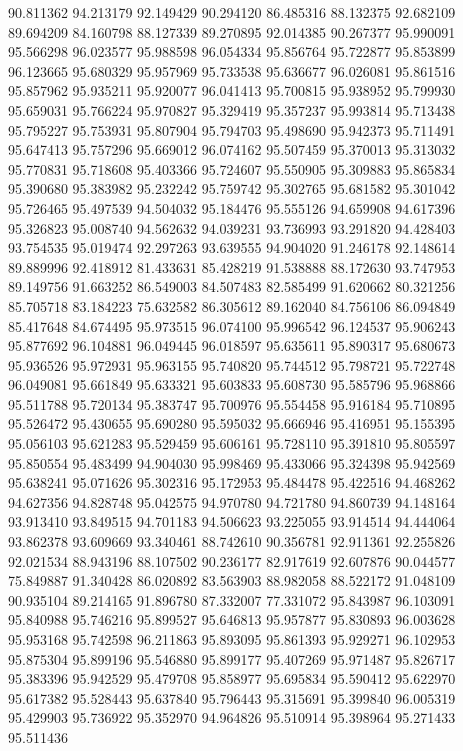 90.811362
94.213179
92.149429
90.294120
86.485316
88.132375
92.682109
89.694209
84.160798
88.127339
89.270895
92.014385
90.267377
95.990091
95.566298
96.023577
95.988598
96.054334
95.856764
95.722877
95.853899
96.123665
95.680329
95.957969
95.733538
95.636677
96.026081
95.861516
95.857962
95.935211
95.920077
96.041413
95.700815
95.938952
95.799930
95.659031
95.766224
95.970827
95.329419
95.357237
95.993814
95.713438
95.795227
95.753931
95.807904
95.794703
95.498690
95.942373
95.711491
95.647413
95.757296
95.669012
96.074162
95.507459
95.370013
95.313032
95.770831
95.718608
95.403366
95.724607
95.550905
95.309883
95.865834
95.390680
95.383982
95.232242
95.759742
95.302765
95.681582
95.301042
95.726465
95.497539
94.504032
95.184476
95.555126
94.659908
94.617396
95.326823
95.008740
94.562632
94.039231
93.736993
93.291820
94.428403
93.754535
95.019474
92.297263
93.639555
94.904020
91.246178
92.148614
89.889996
92.418912
81.433631
85.428219
91.538888
88.172630
93.747953
89.149756
91.663252
86.549003
84.507483
82.585499
91.620662
80.321256
85.705718
83.184223
75.632582
86.305612
89.162040
84.756106
86.094849
85.417648
84.674495
95.973515
96.074100
95.996542
96.124537
95.906243
95.877692
96.104881
96.049445
96.018597
95.635611
95.890317
95.680673
95.936526
95.972931
95.963155
95.740820
95.744512
95.798721
95.722748
96.049081
95.661849
95.633321
95.603833
95.608730
95.585796
95.968866
95.511788
95.720134
95.383747
95.700976
95.554458
95.916184
95.710895
95.526472
95.430655
95.690280
95.595032
95.666946
95.416951
95.155395
95.056103
95.621283
95.529459
95.606161
95.728110
95.391810
95.805597
95.850554
95.483499
94.904030
95.998469
95.433066
95.324398
95.942569
95.638241
95.071626
95.302316
95.172953
95.484478
95.422516
94.468262
94.627356
94.828748
95.042575
94.970780
94.721780
94.860739
94.148164
93.913410
93.849515
94.701183
94.506623
93.225055
93.914514
94.444064
93.862378
93.609669
93.340461
88.742610
90.356781
92.911361
92.255826
92.021534
88.943196
88.107502
90.236177
82.917619
92.607876
90.044577
75.849887
91.340428
86.020892
83.563903
88.982058
88.522172
91.048109
90.935104
89.214165
91.896780
87.332007
77.331072
95.843987
96.103091
95.840988
95.746216
95.899527
95.646813
95.957877
95.830893
96.003628
95.953168
95.742598
96.211863
95.893095
95.861393
95.929271
96.102953
95.875304
95.899196
95.546880
95.899177
95.407269
95.971487
95.826717
95.383396
95.942529
95.479708
95.858977
95.695834
95.590412
95.622970
95.617382
95.528443
95.637840
95.796443
95.315691
95.399840
96.005319
95.429903
95.736922
95.352970
94.964826
95.510914
95.398964
95.271433
95.511436
